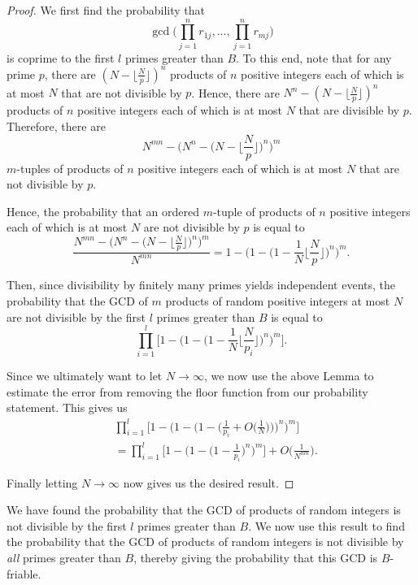 \documentclass[12pt]{amsart}
\theoremstyle{definition}
\begin{document}
\begin{proof}
	We first find the probability that 
	$$\gcd\Big(\prod_{j=1}^nr_{1j}, ..., \prod_{j=1}^n r_{mj}\Big)$$
	is coprime to the first $l$ primes greater than $B$.  To this end, note that for any prime $p$, there are $(N - \lfloor\frac{N}{p}\rfloor)^n$ products of $n$ positive integers each of which is at most $N$ that are not divisible by $p$. Hence, there are $N^n - (N - \lfloor\frac{N}{p}\rfloor)^n$ products of $n$ positive integers each of which is at most $N$ that are divisible by $p$. Therefore, there are 
	$$N^{mn} - \Big(N^n - \Big(N - \Big\lfloor\frac{N}{p}\Big\rfloor\Big)^n\Big)^m$$
	$m$-tuples of products of $n$ positive integers each of which is at most $N$ that are not divisible by $p$.
	
	Hence, the probability that an ordered $m$-tuple of products of $n$ positive integers each of which is at most $N$ are not divisible by $p$ is equal to
	$$\frac{N^{mn} - \Big(N^n - \Big(N - \Big\lfloor\frac{N}{p}\Big\rfloor\Big)^n\Big)^m}{N^{mn}} = 1 - \Big(1 - \Big(1 - \frac{1}{N} \Big\lfloor\frac{N}{p}\Big\rfloor\Big)^n\Big)^m.$$
	
	Then, since divisibility by finitely many primes yields independent events, the probability that the GCD of $m$ products of random positive integers at most $N$ are not divisible by the first $l$ primes greater than $B$ is equal to
	$$\prod_{i=1}^l \Big[1 - \Big(1 - \Big(1 - \frac{1}{N}\Big\lfloor\frac{N}{p_i}\Big\rfloor\Big)^n\Big)^m\Big].$$
	
	Since we ultimately want to let $N \to \infty$, we now use the above Lemma to estimate the error from removing the floor function from our probability statement. This gives us
	\begin{align*}& \prod_{i=1}^l \Big[1 - \Big(1 - \Big(1 - \Big(\frac{1}{p_i} + O\Big(\frac{1}{N}\Big)\Big) \Big)^n\Big)^m\Big]\\
		&= \prod_{i=1}^l \Big[1 - \Big(1 - \Big(1 - \frac{1}{p_i}  \Big)^n\Big)^m\Big] + O\Big(\frac{1}{N^{nm}}\Big).\end{align*}
	
	\noindent Finally letting $N \to \infty$ now gives us the desired result.
\end{proof}

We have found the probability that the GCD of products of random integers is not divisible by the first \(l\) primes greater than \(B\). We now use this result to find the probability that the GCD of products of random integers is not divisible by \textit{all} primes greater than $B$, thereby giving the probability that this GCD is $B$-friable.
\end{document}
